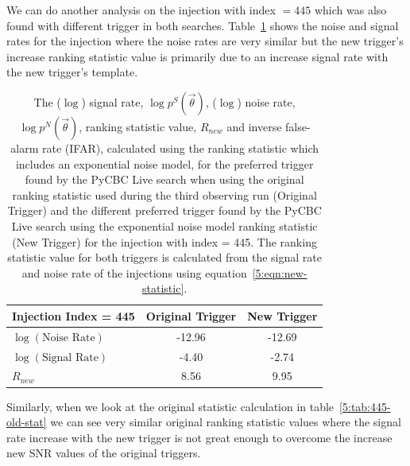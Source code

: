 We can do another analysis on the injection with index $= 445$ which was also found with different trigger in both searches. Table~\ref{5:tab:445-new-stat} shows the noise and signal rates for the injection where the noise rates are very similar but the new trigger's increase ranking statistic value is primarily due to an increase signal rate with the new trigger's template.
%
\begin{table}[ht]
    \centering
    \begin{tabular}{lcc}
        \toprule
        \textbf{Injection Index = 445} & \textbf{Original Trigger} & \textbf{New Trigger} \\
        \midrule
        $\log\left(\text{Noise Rate}\right)$  & -12.96 & -12.69 \\
        $\log\left(\text{Signal Rate}\right)$ & -4.40 & -2.74 \\
        $R_{new}$ & 8.56 & 9.95 \\
        \bottomrule
    \end{tabular}
    \caption{The ($\log$) signal rate, $\log p^{S}(\Vec{\theta})$, ($\log$) noise rate, $\log p^{N}(\Vec{\theta})$, ranking statistic value, $R_{new}$ and inverse false-alarm rate (IFAR), calculated using the ranking statistic which includes an exponential noise model, for the preferred trigger found by the PyCBC Live search when using the original ranking statistic used during the third observing run (Original Trigger) and the different preferred trigger found by the PyCBC Live search using the exponential noise model ranking statistic (New Trigger) for the injection with index = 445. The ranking statistic value for both triggers is calculated from the signal rate and noise rate of the injections using equation~\ref{5:eqn:new-statistic}.}
    \label{5:tab:445-new-stat}
\end{table}
%
Similarly, when we look at the original statistic calculation in table~\ref{5:tab:445-old-stat} we can see very similar original ranking statistic values where the signal rate increase with the new trigger is not great enough to overcome the increase new SNR values of the original triggers.
%
